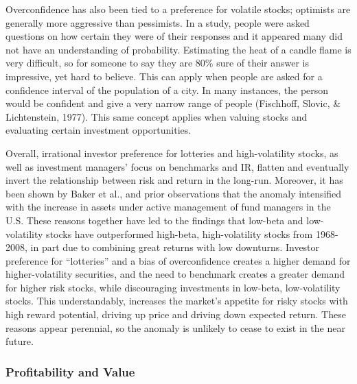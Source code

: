 \documentclass[12pt,twoside]{reedthesis}
\theoremstyle{definition}
\theoremstyle{definition}
\theoremstyle{definition}
\theoremstyle{remark}
\begin{document}
Overconfidence has also been tied to a preference for volatile stocks;
optimists are generally more aggressive than pessimists. In a study,
people were asked questions on how certain they were of their responses
and it appeared many did not have an understanding of probability.
Estimating the heat of a candle flame is very difficult, so for someone
to say they are 80\% sure of their answer is impressive, yet hard to
believe. This can apply when people are asked for a confidence interval
of the population of a city. In many instances, the person would be
confident and give a very narrow range of people (Fischhoff, Slovic, \&
Lichtenstein, 1977). This same concept applies when valuing stocks and
evaluating certain investment opportunities.

Overall, irrational investor preference for lotteries and
high-volatility stocks, as well as investment managers' focus on
benchmarks and IR, flatten and eventually invert the relationship
between risk and return in the long-run. Moreover, it has been shown by
Baker et al., and prior observations that the anomaly intensified with
the increase in assets under active management of fund managers in the
U.S. These reasons together have led to the findings that low-beta and
low-volatility stocks have outperformed high-beta, high-volatility
stocks from 1968-2008, in part due to combining great returns with low
downturns. Investor preference for ``lotteries'' and a bias of
overconfidence creates a higher demand for higher-volatility securities,
and the need to benchmark creates a greater demand for higher risk
stocks, while discouraging investments in low-beta, low-volatility
stocks. This understandably, increases the market's appetite for risky
stocks with high reward potential, driving up price and driving down
expected return. These reasons appear perennial, so the anomaly is
unlikely to cease to exist in the near future.

\subsubsection{Profitability and Value}\label{profitability-and-value}
\end{document}
